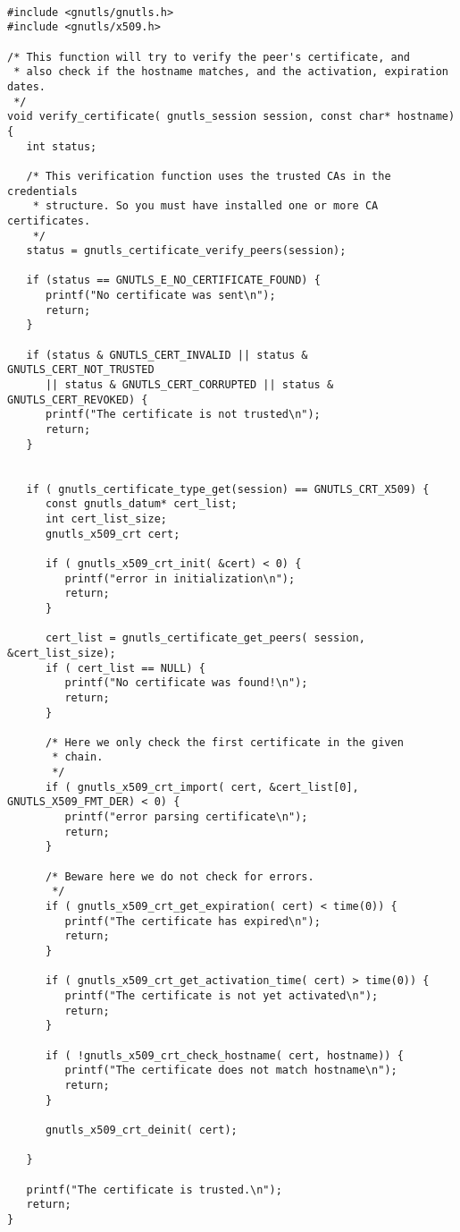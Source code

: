 \label{ex:rfc2818}

\begin{verbatim}

#include <gnutls/gnutls.h>
#include <gnutls/x509.h>

/* This function will try to verify the peer's certificate, and
 * also check if the hostname matches, and the activation, expiration dates.
 */
void verify_certificate( gnutls_session session, const char* hostname)
{
   int status;

   /* This verification function uses the trusted CAs in the credentials
    * structure. So you must have installed one or more CA certificates.
    */
   status = gnutls_certificate_verify_peers(session);

   if (status == GNUTLS_E_NO_CERTIFICATE_FOUND) {
      printf("No certificate was sent\n");
      return;
   }

   if (status & GNUTLS_CERT_INVALID || status & GNUTLS_CERT_NOT_TRUSTED
      || status & GNUTLS_CERT_CORRUPTED || status & GNUTLS_CERT_REVOKED) {
      printf("The certificate is not trusted\n");
      return;
   }


   if ( gnutls_certificate_type_get(session) == GNUTLS_CRT_X509) {
      const gnutls_datum* cert_list;
      int cert_list_size;
      gnutls_x509_crt cert;

      if ( gnutls_x509_crt_init( &cert) < 0) {
         printf("error in initialization\n");
         return;
      }

      cert_list = gnutls_certificate_get_peers( session, &cert_list_size);
      if ( cert_list == NULL) {
         printf("No certificate was found!\n");
         return;
      }

      /* Here we only check the first certificate in the given
       * chain.
       */
      if ( gnutls_x509_crt_import( cert, &cert_list[0], GNUTLS_X509_FMT_DER) < 0) {
         printf("error parsing certificate\n");
         return;
      }

      /* Beware here we do not check for errors.
       */
      if ( gnutls_x509_crt_get_expiration( cert) < time(0)) {
         printf("The certificate has expired\n");
         return;
      }

      if ( gnutls_x509_crt_get_activation_time( cert) > time(0)) {
         printf("The certificate is not yet activated\n");
         return;
      }

      if ( !gnutls_x509_crt_check_hostname( cert, hostname)) {
         printf("The certificate does not match hostname\n");
         return;
      }

      gnutls_x509_crt_deinit( cert);

   }

   printf("The certificate is trusted.\n");
   return;
}

\end{verbatim}
